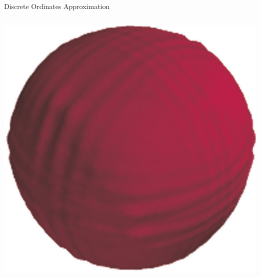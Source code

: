 \documentclass{beamer}
\begin{document}
\begin{frame}{Discrete Ordinates Approximation}
\begin{columns}
\begin{column}{0.4\textwidth}
\includegraphics[width=\textwidth,natwidth=599,natheight=588]{img/ray-effects-fine.png}
\end{column}
\end{columns}
%
\end{frame}
\end{document}
